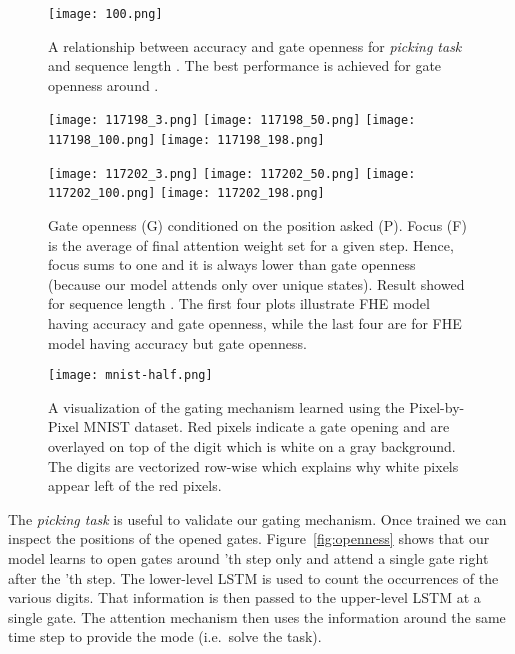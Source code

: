 \begin{figure}[hpt!]
\begin{minipage}{0.48\textwidth}
\centering
\texttt{[image: 100.png]}
\vspace{-0.00cm}
\caption{A relationship between accuracy and gate openness for \emph{picking task} and sequence length . The best performance is achieved for gate openness around .}
\label{accVSopen100}
\end{minipage}

\bigskip

\begin{minipage}{0.48\textwidth}
\centering
\texttt{[image: 117198\_3.png]} 
\texttt{[image: 117198\_50.png]}
\texttt{[image: 117198\_100.png]} 
\texttt{[image: 117198\_198.png]} 


\texttt{[image: 117202\_3.png]} 
\texttt{[image: 117202\_50.png]}
\texttt{[image: 117202\_100.png]} 
\texttt{[image: 117202\_198.png]} 
\vspace{-0.00cm}
\caption{Gate openness (G) conditioned on the position asked (P). Focus (F) is the average of final attention weight set for a given step. Hence, focus sums to one and it is always lower than gate openness (because our model attends only over unique states). Result showed for sequence length . The first four plots illustrate FHE model having  accuracy and  gate openness, while the last four are for FHE model having  accuracy but  gate openness.}
\label{fig:openness}
\end{minipage}

\bigskip

\begin{minipage}{0.48\textwidth}
\centering
\texttt{[image: mnist-half.png]}
\caption{A visualization of the gating mechanism learned using the Pixel-by-Pixel MNIST dataset. Red pixels indicate a gate opening and are overlayed on top of the digit which is white on a gray background. The digits are vectorized row-wise which explains why white pixels appear left of the red pixels.}
\label{fig:qca}
\vspace{-0.00cm}
\end{minipage}
\end{figure}

The \emph{picking task} is useful to validate our gating mechanism. Once trained we can inspect the positions of the opened gates. Figure~\ref{fig:openness} shows that our model learns to open gates around 'th step only and attend a single gate right after the 'th step. The lower-level LSTM is used to count the occurrences of the various digits. That information is then passed to the upper-level LSTM at a single gate. The attention mechanism then uses the information around the same time step to provide the mode (i.e.\, solve the task).


